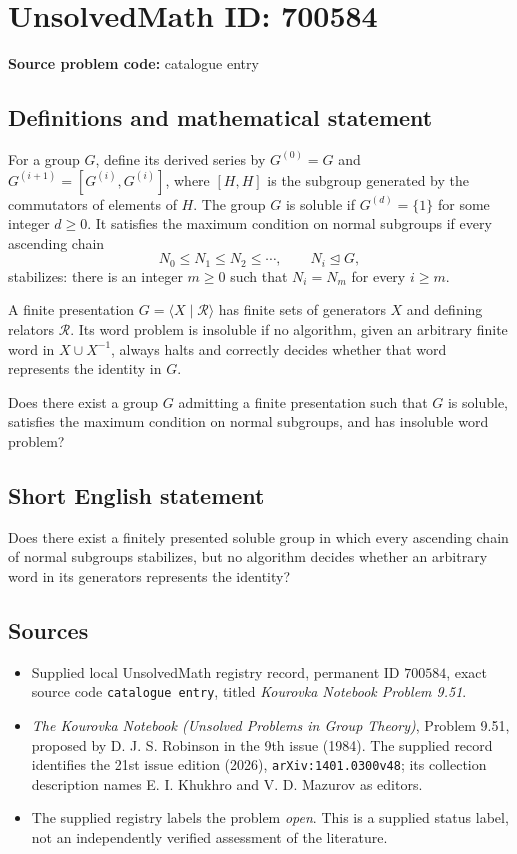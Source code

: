 \documentclass[11pt]{article}
\begin{document}
\section*{UnsolvedMath ID: 700584}
\textbf{Source problem code:} catalogue entry
\subsection{Definitions and mathematical statement}
For a group \(G\), define its derived series by \(G^{(0)}=G\) and \(G^{(i+1)}=[G^{(i)},G^{(i)}]\), where \([H,H]\) is the subgroup generated by the commutators of elements of \(H\). The group \(G\) is soluble if \(G^{(d)}=\{1\}\) for some integer \(d\geq 0\). It satisfies the maximum condition on normal subgroups if every ascending chain
\[
N_0\leq N_1\leq N_2\leq\cdots,\qquad N_i\trianglelefteq G,
\]
stabilizes: there is an integer \(m\geq 0\) such that \(N_i=N_m\) for every \(i\geq m\).

A finite presentation \(G=\langle X\mid\mathcal{R}\rangle\) has finite sets of generators \(X\) and defining relators \(\mathcal{R}\). Its word problem is insoluble if no algorithm, given an arbitrary finite word in \(X\cup X^{-1}\), always halts and correctly decides whether that word represents the identity in \(G\).

Does there exist a group \(G\) admitting a finite presentation such that \(G\) is soluble, satisfies the maximum condition on normal subgroups, and has insoluble word problem?
\subsection{Short English statement}
Does there exist a finitely presented soluble group in which every ascending chain of normal subgroups stabilizes, but no algorithm decides whether an arbitrary word in its generators represents the identity?
\subsection{Sources}
\begin{itemize}
\item Supplied local UnsolvedMath registry record, permanent ID \(700584\), exact source code \texttt{catalogue entry}, titled \emph{Kourovka Notebook Problem 9.51}.
\item \emph{The Kourovka Notebook (Unsolved Problems in Group Theory)}, Problem 9.51, proposed by D. J. S. Robinson in the 9th issue (1984). The supplied record identifies the 21st issue edition (2026), \texttt{arXiv:1401.0300v48}; its collection description names E. I. Khukhro and V. D. Mazurov as editors.
\item The supplied registry labels the problem \emph{open}. This is a supplied status label, not an independently verified assessment of the literature.
\end{itemize}
\end{document}
